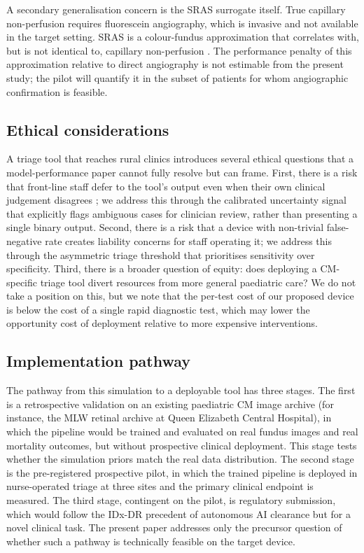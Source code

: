 \documentclass[twocolumn,10pt]{article}
\begin{document}
A secondary generalisation concern is the SRAS surrogate itself.
True capillary non-perfusion requires fluorescein angiography,
which is invasive and not available in the target setting. SRAS
is a colour-fundus approximation that correlates with, but is not
identical to, capillary non-perfusion \cite{Joshi2017}. The
performance penalty of this approximation relative to direct
angiography is not estimable from the present study; the pilot
will quantify it in the subset of patients for whom angiographic
confirmation is feasible.

\subsection{Ethical considerations}
A triage tool that reaches rural clinics introduces several
ethical questions that a model-performance paper cannot fully
resolve but can frame. First, there is a risk that front-line
staff defer to the tool's output even when their own clinical
judgement disagrees \cite{CabitzaRasoini2017}; we address this
through the calibrated uncertainty signal that explicitly flags
ambiguous cases for clinician review, rather than presenting a
single binary output. Second, there is a risk that a device with
non-trivial false-negative rate creates liability concerns for
staff operating it; we address this through the asymmetric
triage threshold that prioritises sensitivity over specificity.
Third, there is a broader question of equity: does deploying a
CM-specific triage tool divert resources from more general
paediatric care? We do not take a position on this, but we note
that the per-test cost of our proposed device is below the cost
of a single rapid diagnostic test, which may lower the opportunity
cost of deployment relative to more expensive interventions.

\subsection{Implementation pathway}
The pathway from this simulation to a deployable tool has three
stages. The first is a retrospective validation on an existing
paediatric CM image archive (for instance, the MLW retinal
archive at Queen Elizabeth Central Hospital), in which the
pipeline would be trained and evaluated on real fundus images and
real mortality outcomes, but without prospective clinical
deployment. This stage tests whether the simulation priors match
the real data distribution. The second stage is the
pre-registered prospective pilot, in which the trained pipeline
is deployed in nurse-operated triage at three sites and the
primary clinical endpoint is measured. The third stage, contingent
on the pilot, is regulatory submission, which would follow the
IDx-DR precedent \cite{Abramoff2018IDx} of autonomous AI
clearance but for a novel clinical task. The present paper
addresses only the precursor question of whether such a pathway
is technically feasible on the target device.
\end{document}
